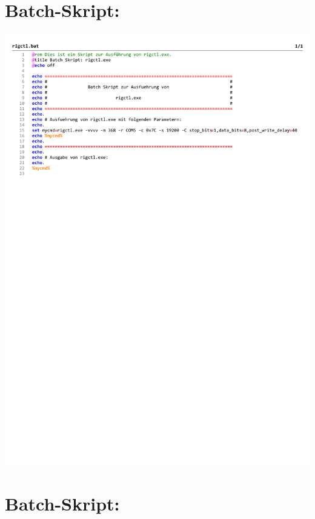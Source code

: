 
\chapter{Batch-Skript: }
\label{chap:rigctlbat}

\begin{center}
	\includegraphics[width=1\textwidth]{./appendicies/rigctl}
\end{center}


\chapter{Batch-Skript: }
\label{chap:rotctldbat}

